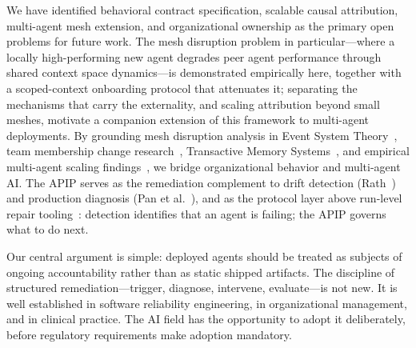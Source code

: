 We have identified behavioral contract specification, scalable causal
attribution, multi-agent mesh extension, and organizational ownership as the
primary open problems for future work. The mesh disruption problem in
particular---where a locally high-performing new agent degrades peer agent
performance through shared context space dynamics---is demonstrated
empirically here, together with a scoped-context onboarding protocol that
attenuates it; separating the mechanisms that carry the externality, and
scaling attribution beyond small meshes, motivate a companion extension of
this framework to multi-agent deployments. By grounding mesh disruption
analysis in Event
System Theory~\cite{morgeson2015event}, team membership change
research~\cite{summers2012team,trainer2020membership}, Transactive Memory
Systems~\cite{ren2011transactive,wegner1987transactive}, and empirical
multi-agent scaling findings~\cite{kim2025scaling}, we bridge organizational
behavior and multi-agent AI. The APIP serves as the remediation complement to
drift detection (Rath~\cite{rath2026drift}) and production diagnosis (Pan et
al.~\cite{pan2025measuring}), and as the protocol layer above run-level repair
tooling~\cite{zhu2026agentdebugx}: detection identifies that an agent is
failing; the APIP governs what to do next.

Our central argument is simple: deployed agents should be treated as subjects
of ongoing accountability rather than as static shipped artifacts. The
discipline of structured remediation---trigger, diagnose, intervene,
evaluate---is not new. It is well established in software reliability
engineering, in organizational management, and in clinical practice. The AI
field has the opportunity to adopt it deliberately, before regulatory
requirements make adoption mandatory.
